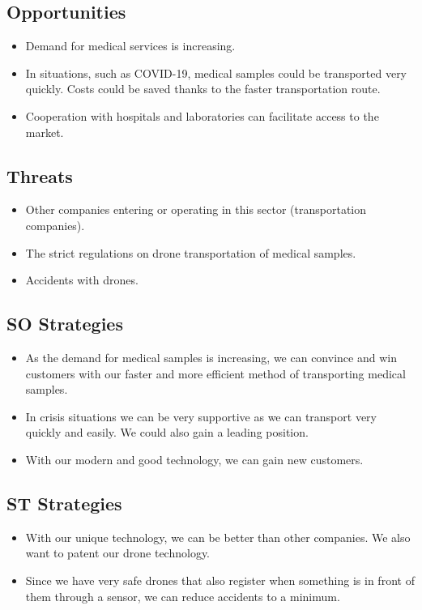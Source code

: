 \subsection{Opportunities}
\begin{itemize}
  \item Demand for medical services is increasing.
  \item In situations, such as COVID-19, medical samples could be transported very quickly. Costs could be saved thanks to the faster transportation route.
  \item Cooperation with hospitals and laboratories can facilitate access to the market.
\end{itemize}
\subsection{Threats}
\begin{itemize}
  \item Other companies entering or operating in this sector (transportation companies).
  \item The strict regulations on drone transportation of medical samples.
  \item Accidents with drones.
\end{itemize}
\subsection{SO Strategies}
\begin{itemize}
  \item As the demand for medical samples is increasing, we can convince and win customers with our faster and more efficient method of transporting medical samples.
  \item In crisis situations we can be very supportive as we can transport very quickly and easily. We could also gain a leading position.
  \item With our modern and good technology, we can gain new customers.
\end{itemize}
\subsection{ST Strategies}
\begin{itemize}
  \item With our unique technology, we can be better than other companies. We also want to patent our drone technology.
  \item Since we have very safe drones that also register when something is in front of them through a sensor, we can reduce accidents to a minimum.
\end{itemize}
